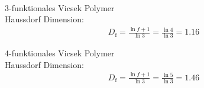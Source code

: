 \documentclass[final]{beamer}
\newlength{\columnheight}
\newlength{\marginw}
\newlength{\tw}
\newlength{\colw}
\newenvironment{myTwoColPoster}{%
  \begin{minipage}[t]{\textwidth}%
    \hspace*{\marginw}%
    \hspace*{9.5bp}%
    \begin{minipage}[t]{\tw}}%
  {\end{minipage}%
   \hspace*{\marginw}%
   \end{minipage}}
\newenvironment{myCol}%
    {\begin{minipage}[t][\columnheight][t]{\colw}}%
    {\end{minipage}}
\begin{document}
\begin{frame}[t]{}
\begin{myTwoColPoster}
\begin{myCol}
  \begin{minipage}[c]{0.48\textwidth}
    {}\\
    3-funktionales Vicsek Polymer\\
    Haussdorf Dimension:
    \begin{align*}
      D_\text{f}=\frac{\ln{f+1}}{\ln{3}} = \frac{\ln{4}}{\ln{3}} = 1.16
    \end{align*}
  \end{minipage}
  \hfill
  \begin{minipage}[c]{0.48\textwidth}
    4-funktionales Vicsek Polymer\\
    Haussdorf Dimension:
    \begin{align*}
      D_\text{f}=\frac{\ln{f+1}}{\ln{3}} = \frac{\ln{5}}{\ln{3}} = 1.46
    \end{align*}
    \vspace*{4cm}

\end{minipage}
\end{myCol}
\end{myTwoColPoster}
\end{frame}
\end{document}
